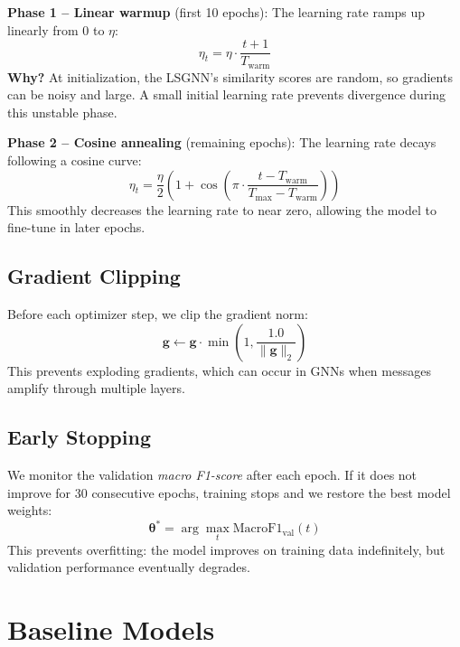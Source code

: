\documentclass[conference]{IEEEtran}
\newcommand{\vect}[1]{\bm{#1}}
\begin{document}
\textbf{Phase 1 -- Linear warmup} (first 10 epochs): The learning rate ramps up linearly from 0 to $\eta$:
\begin{equation}
    \eta_t = \eta \cdot \frac{t + 1}{T_{\text{warm}}}
\end{equation}
\textbf{Why?} At initialization, the LSGNN's similarity scores are random, so gradients can be noisy and large. A small initial learning rate prevents divergence during this unstable phase.

\textbf{Phase 2 -- Cosine annealing} (remaining epochs): The learning rate decays following a cosine curve:
\begin{equation}
    \eta_t = \frac{\eta}{2} \left(1 + \cos\left(\pi \cdot \frac{t - T_{\text{warm}}}{T_{\max} - T_{\text{warm}}}\right)\right)
\end{equation}
This smoothly decreases the learning rate to near zero, allowing the model to fine-tune in later epochs.

\subsection{Gradient Clipping}

Before each optimizer step, we clip the gradient norm:
\begin{equation}
    \vect{g} \leftarrow \vect{g} \cdot \min\!\left(1, \frac{1.0}{\|\vect{g}\|_2}\right)
\end{equation}
This prevents exploding gradients, which can occur in GNNs when messages amplify through multiple layers.

\subsection{Early Stopping}

We monitor the validation \emph{macro F1-score} after each epoch. If it does not improve for 30 consecutive epochs, training stops and we restore the best model weights:
\begin{equation}
    \bm{\theta}^* = \arg\max_{t} \text{MacroF1}_{\text{val}}(t)
\end{equation}
This prevents overfitting: the model improves on training data indefinitely, but validation performance eventually degrades.

\section{Baseline Models}
\label{sec:baselines}
\end{document}
